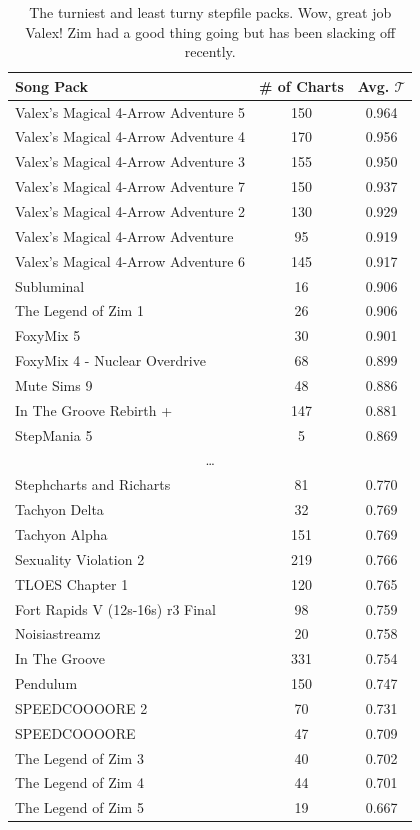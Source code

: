 \documentclass[10pt]{sigplanconf}
\begin{document}
\begin{table}[t]
	\begin{center}
		\small
	\begin{tabular}{l|c|c}
		Song Pack & \# of Charts & Avg. $\mathcal{T}$ \\
		\hline
		Valex's Magical 4-Arrow Adventure 5 & 150 & 0.964 \\
		Valex's Magical 4-Arrow Adventure 4 & 170 & 0.956 \\
		Valex's Magical 4-Arrow Adventure 3 & 155 & 0.950 \\
		Valex's Magical 4-Arrow Adventure 7 & 150 & 0.937 \\
		Valex's Magical 4-Arrow Adventure 2 & 130 & 0.929 \\
		Valex's Magical 4-Arrow Adventure   & 95 & 0.919 \\
		Valex's Magical 4-Arrow Adventure 6 & 145 & 0.917 \\
		Subluminal & 16 & 0.906 \\
		The Legend of Zim 1 & 26 & 0.906 \\
		FoxyMix 5 & 30 & 0.901 \\
		FoxyMix 4 - Nuclear Overdrive & 68 & 0.899 \\ 
		Mute Sims 9 & 48 & 0.886 \\
		In The Groove Rebirth + & 147 & 0.881 \\
		StepMania 5 & 5 & 0.869 \\
		\multicolumn{3}{c}{\normalsize\dots} \\
		Stephcharts and Richarts & 81 & 0.770 \\
		Tachyon Delta & 32 & 0.769 \\
		Tachyon Alpha & 151 & 0.769 \\
		Sexuality Violation 2 & 219 & 0.766 \\
		TLOES Chapter 1 & 120 & 0.765 \\
		Fort Rapids V (12s-16s) r3 Final & 98 & 0.759 \\
		Noisiastreamz & 20 & 0.758 \\
		In The Groove & 331 & 0.754 \\
		Pendulum & 150 & 0.747 \\
		SPEEDCOOOORE 2 & 70 & 0.731 \\
		SPEEDCOOOORE & 47 & 0.709 \\
		The Legend of Zim 3 & 40 & 0.702 \\
		The Legend of Zim 4 & 44 & 0.701 \\
		The Legend of Zim 5 & 19 & 0.667 \\
	\end{tabular}
	\end{center}
	\caption{The turniest and least turny stepfile packs. Wow, great job Valex! Zim had a good thing going but has been slacking off recently.}
	\label{tab:pack}
\end{table}
\end{document}
